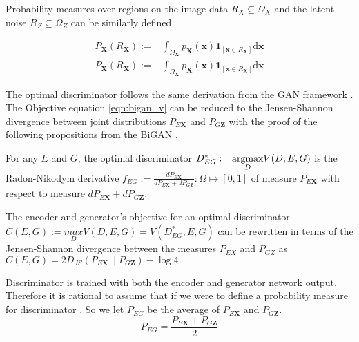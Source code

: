 Probability measures over regions on the image data $R_X \subseteq \Omega_{X}$ and the latent noise
$R_Z \subseteq \Omega_{Z}$ can be similarly defined.

\begin{align}
    P_{\mathbf{X}}\left(R_{\mathbf{X}}\right) :=&\int_{\Omega_{\mathbf{X}}} p_{\mathbf{X}}(\mathbf{x}) \mathbf{1}_{\left[\mathbf{x} \in R_{\mathbf{X}}\right]} \mathrm{d} \mathbf{x} \\[5pt]
    P_{\mathbf{X}}\left(R_{\mathbf{X}}\right) :=&\int_{\Omega_{\mathbf{X}}} p_{\mathbf{X}}(\mathbf{x}) \mathbf{1}_{\left[\mathbf{x} \in R_{\mathbf{X}}\right]} \mathrm{d} \mathbf{x}
\end{align}

The optimal discriminator follows the same derivation from the GAN framework
\cite{Goodfellow:2014:GAN:2969033.2969125}. The Objective equation \ref{eqn:bigan_v} can be reduced
to the Jensen-Shannon divergence between joint distributions $P_{E\mathbf{X}}$ and $P_{G\mathbf{Z}}$
with the proof of the following propositions from the BiGAN \cite{Donahue2017AdversarialFL}.

\begin{prop}
    \label{prop:bigan_1}
    For any $E$ and $G$, the optimal discriminator $D^*_{EG} := \\ \underset{D}{\text{argmax}}  V(D, E,
    G)$ is the Radon-Nikodym derivative $f_{EG} := \frac{dP_{E\mathbf{X}}}{dP_{E\mathbf{X}} +
    dP_{G\mathbf{Z}}}  : \Omega  \mapsto [0, 1]$ of measure $P_{E\mathbf{X}}$ with respect to measure
    $ dP_{E\mathbf{X}} + dP_{G\mathbf{Z}}$.
\end{prop}

\begin{prop}
    \label{prop:bigan_2}
  The encoder and generator's objective for an optimal discriminator $C(E, G):= \underset{D}{max}
  V(D, E, G) = V(D^*_{EG}, E, G)$ can be rewritten in terms of the Jensen-Shannon divergence between
  the measures $P_{EX}$ and $P_{GZ}$ as $C(E, G) = 2 D_{JS} (P_{E\mathbf{X}} \parallel P_{G\mathbf{Z}}) -
  \log 4$    
\end{prop}

Discriminator is trained with both the encoder and generator network output. Therefore it is
rational to assume that if we were to define a probability measure for discriminator . So we let $P_{EG}$
be the average of $P_{E\mathbf{X}}$ and $P_{G\mathbf{Z}}$. 
\begin{equation}
  P_{EG} = \frac{P_{E\mathbf{X}} + P_{G\mathbf{Z}}}{2}  
\end{equation}

